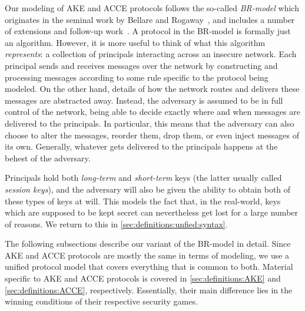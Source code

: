 Our modeling of AKE and ACCE protocols follows the so-called \emph{BR-model} which originates in the seminal work by Bellare and Rogaway~\cite{C:BelRog93},
and includes a number of extensions and follow-up work~\cite{STOC:BelRog95,Blake-WilsonM:1997:BR93_asymmetric,EC:BelPoiRog00,EC:CanKra01}.
A protocol in the BR-model is formally just an algorithm.
However,
it is more useful to think of what this algorithm \emph{represents}:
a collection of principals interacting across an insecure network.
Each principal sends and receives messages over the network by constructing and processing messages according to some rule specific to the protocol being modeled.
On the other hand, 
details of how the network routes and delivers these messages are abstracted away.
Instead,
the adversary is assumed to be in full control of the network,
being able to decide exactly where and when messages are delivered to the principals.
In particular,
this means that the adversary can also choose to alter the messages,
reorder them,
drop them,
or even inject messages of its own.
Generally,
whatever gets delivered to the principals happens at the behest of the adversary. 

Principals hold both \emph{long-term} and \emph{short-term}  keys (the latter usually called \emph{session keys}),
and the adversary will also be given the ability to obtain both of these types of keys at will.
This models the fact that, in the real-world,
keys which are supposed to be kept secret can nevertheless get lost for a large number of reasons.
We return to this in \cref{sec:definitions:unfied:syntax}.

The following subsections describe our variant of the BR-model in detail.
Since AKE and ACCE protocols are mostly the same in terms of modeling,
we use a unified protocol model that covers everything that is common to both.
Material specific to AKE and ACCE protocols is covered in \cref{sec:definitions:AKE} and \cref{sec:definitions:ACCE},
respectively.
Essentially,
their main difference lies in the winning conditions of their respective security games.
 


